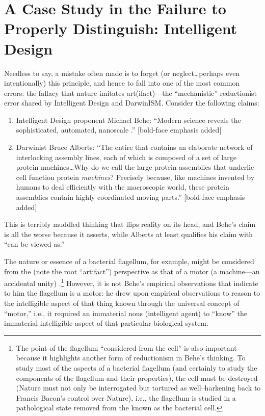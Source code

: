 \section[A Case Study]{A Case Study in the Failure to Properly Distinguish: Intelligent Design}

Needless to say, a mistake often made is to forget (or neglect\ldots perhaps even intentionally) this principle, and hence to fall into one of the most common errors: the fallacy that nature imitates art(ifact)---the ``mechanistic'' reductionist error shared by Intelligent Design and DarwinISM. Consider the following claims:

\begin{enumerate}
\item Intelligent Design proponent Michael Behe: ``Modern science reveals the  sophisticated, automated, nanoscale .''\cite{beheinterview} [bold-face emphasis added]
\item Darwinist Bruce Alberts: ``The entire  that contains an elaborate network of interlocking assembly lines, each of which is composed of a set of large protein machines\ldots Why do we call the large protein assemblies that underlie cell function protein \emph{machines}? Precisely because, like machines invented by humans to deal efficiently with the macroscopic world, these protein assemblies contain highly coordinated moving parts.''\cite{balberts} [bold-face emphasis added]
\end{enumerate}

This is terribly muddled thinking that flips reality on its head, and Behe's claim is all the worse because it asserts, while Alberts at least qualifies his claim with ``can be viewed as.''

The nature or essence of a bacterial flagellum, for example, might be considered from the  (note the root ``artifact'') perspective as that of a motor (a machine---an accidental unity) .\footnote{The point of the flagellum ``considered  from the cell'' is also important because it highlights another form of reductionism in Behe's thinking. To study most of the aspects of a bacterial flagellum (and certainly to study the components of the flagellum and their properties), the cell must be destroyed (Nature must not only be interrogated but tortured as well--harkening back to Francis Bacon's  control over Nature), i.e., the flagellum is studied in a pathological state removed from the  known as the bacterial cell.} However, it is not Behe's empirical observations that indicate to him the flagellum is a motor: he drew upon empirical observations to reason to the intelligible aspect of that thing known through the universal concept of ``motor,'' i.e., it required an immaterial nous (intelligent agent) to ``know'' the immaterial intelligible aspect of that particular biological system.

